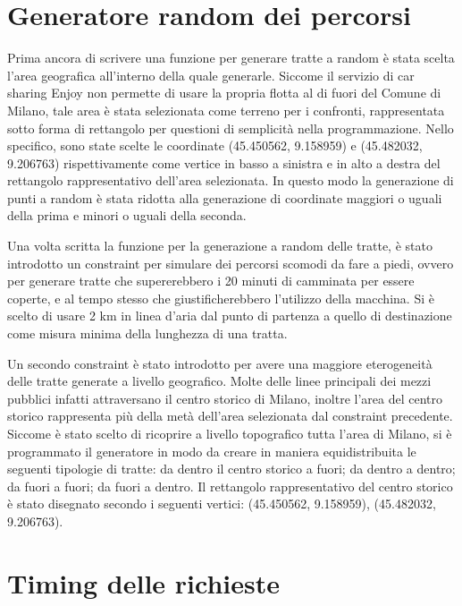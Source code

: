 \section{Generatore random dei percorsi}

Prima ancora di scrivere una funzione per generare tratte a random è stata scelta l'area geografica all'interno della quale generarle. Siccome il servizio di car sharing Enjoy non permette di usare la propria flotta al di fuori del Comune di Milano, tale area è stata selezionata come terreno per i confronti, rappresentata sotto forma di rettangolo per questioni di semplicità nella programmazione. Nello specifico, sono state scelte le coordinate (45.450562\textdegree, 9.158959\textdegree) e (45.482032\textdegree, 9.206763\textdegree) rispettivamente come vertice in basso a sinistra e in alto a destra del rettangolo rappresentativo dell'area selezionata. In questo modo la generazione di punti a random è stata ridotta alla generazione di coordinate maggiori o uguali della prima e minori o uguali della seconda.

Una volta scritta la funzione per la generazione a random delle tratte, è stato introdotto un constraint per simulare dei percorsi scomodi da fare a piedi, ovvero per generare tratte che supererebbero i 20 minuti di camminata per essere coperte, e al tempo stesso che giustificherebbero l'utilizzo della macchina. Si è scelto di usare 2 km in linea d'aria dal punto di partenza a quello di destinazione come misura minima della lunghezza di una tratta.

Un secondo constraint è stato introdotto per avere una maggiore eterogeneità delle tratte generate a livello geografico. Molte delle linee principali dei mezzi pubblici infatti attraversano il centro storico di Milano, inoltre l'area del centro storico rappresenta più della metà dell'area selezionata dal constraint precedente. Siccome è stato scelto di ricoprire a livello topografico tutta l'area di Milano, si è programmato il generatore in modo da creare in maniera equidistribuita le seguenti tipologie di tratte: da dentro il centro storico a fuori; da dentro a dentro; da fuori a fuori; da fuori a dentro. Il rettangolo rappresentativo del centro storico è stato disegnato secondo i seguenti vertici: (45.450562\textdegree, 9.158959\textdegree), (45.482032\textdegree, 9.206763\textdegree).

\section{Timing delle richieste}

